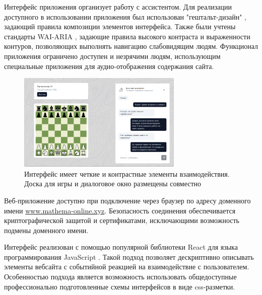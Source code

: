 Интерфейс приложения организует работу с ассистентом. Для реализации доступного в использовании приложения был использован 
"гештальт-дизайн" \cite{wertheimer1938laws}, задающий правила композиции элементов интерфейса. Также были учтены
стандарты WAI-ARIA \cite{craig2009accessible}, задающие правила высокого контраста и выраженности контуров, позволяющих выполнять навигацию слабовидящим людям. 
Функционал приложения ограничено доступен и незрячими людям, использующим специальные приложения для аудио-отображения содержания сайта.

\begin{figure}[h]
    \centering
    \includegraphics[width=0.7\textwidth]{assets/work/games/interface.png}
    \caption{Интерфейс имеет четкие и контрастные элементы взаимодействия. Доска для игры и диалоговое окно размещены совместно }
    \label{chess}
\end{figure}

Веб-приложение доступно при подключение через браузер по адресу доменного имени \url{www.mathema-online.xyz}. 
Безопасность соединения обеспечивается криптографической защитой и сертификатами, исключающими возможность подмены доменного имени.

Интерфейс реализован с помощью популярной библиотеки React для языка программирования JavaScript \cite{gackenheimer2015introduction}.
Такой подход позволяет дескриптивно описывать элементы вебсайта с событийной реакцией на взаимодействие с пользователем. 
Особенностью подхода является возможность использовать общедоступные профессионально подготовленные 
схемы интерфейсов в виде css-разметки.
